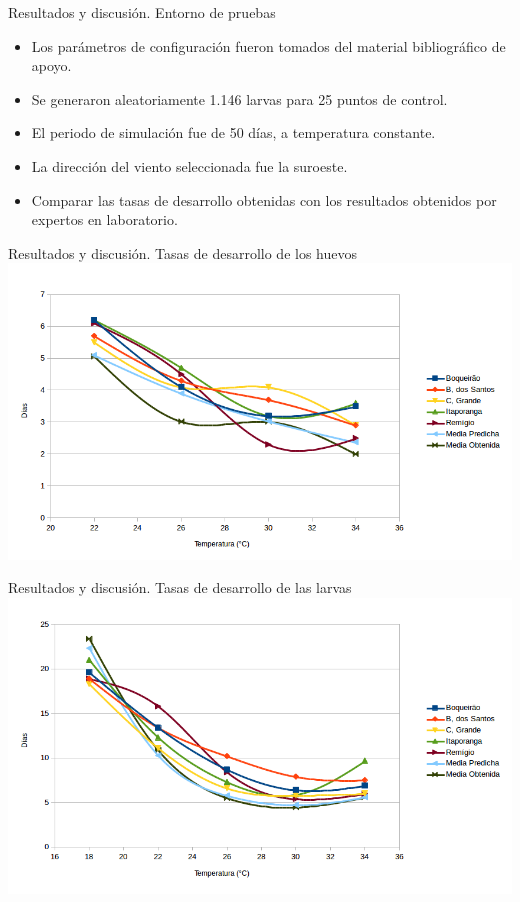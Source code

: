 \begin{frame}[t]{Resultados y discusión. Entorno de pruebas}
\begin{itemize}
    \item Los parámetros de configuración fueron tomados del material bibliográfico de apoyo.
    \item Se generaron aleatoriamente 1.146 larvas para 25 puntos de control.
    \item El periodo de simulación fue de 50 días, a temperatura constante.
    \item La dirección del viento seleccionada fue la suroeste.
    \item Comparar las tasas de desarrollo obtenidas con los resultados obtenidos por expertos en laboratorio.
    \end{itemize}
\end{frame}


\begin{frame}[t]{Resultados y discusión. Tasas de desarrollo de los huevos}
    \includegraphics[width=\textwidth]{./graphics/huevos-desarrollo.png}
\end{frame}

\begin{frame}[t]{Resultados y discusión. Tasas de desarrollo de las larvas}
    \includegraphics[width=\textwidth]{./graphics/larvas-desarrollo.png}
\end{frame}

